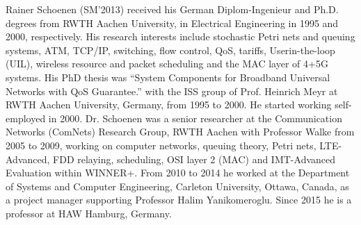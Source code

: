 \documentclass[journal]{IEEEtran}
\begin{document}
\begin{IEEEbiography}{Rainer Schoenen}
(SM'2013) received his German Diplom-Ingenieur and Ph.D.
degrees from RWTH Aachen University,
in Electrical Engineering in 1995 and 2000, respectively.
His research interests include
stochastic Petri nets and queuing systems, ATM,
TCP/IP, switching, flow control, QoS, tariffs,
Userin-the-loop (UIL), wireless resource and packet scheduling
and the MAC layer of 4+5G systems.
His PhD thesis was
“System Components for Broadband Universal Networks with QoS Guarantee.”
with the ISS group of Prof. Heinrich Meyr at RWTH Aachen University, Germany, from 1995 to 2000.
He started working self-employed in 2000.
Dr. Schoenen was a senior researcher at the Communication Networks
(ComNets) Research Group, RWTH Aachen with Professor Walke from 2005 to 2009,
working on computer networks, queuing theory, Petri nets,
LTE-Advanced, FDD relaying, scheduling, OSI layer 2 (MAC) and IMT-Advanced Evaluation within WINNER+.
From 2010 to 2014 he worked at the Department of Systems and Computer Engineering, Carleton University,
Ottawa, Canada, as a project manager supporting Professor Halim Yanikomeroglu.
Since 2015 he is a professor at HAW Hamburg, Germany.
\end{IEEEbiography}
\end{document}

